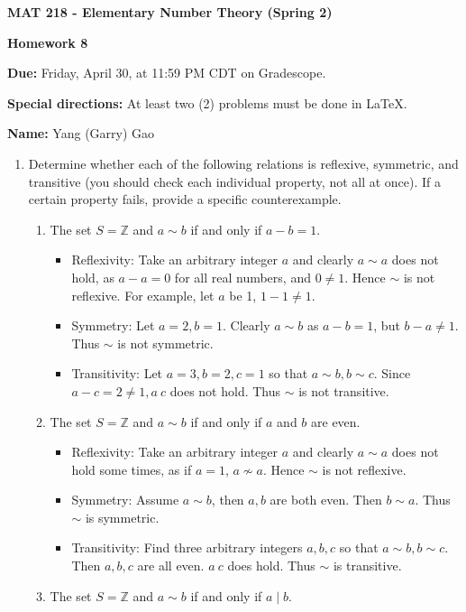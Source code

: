 \documentclass[11pt,a4paper]{article}
\newcommand{\Z}{\mathbb{Z}}
\begin{document}
\begin{Large}
\centerline{\bf MAT 218 - Elementary Number Theory (Spring 2)}\medskip
\centerline{\bf Homework 8}\medskip
\end{Large}
{\bf Due:} Friday, April 30, at 11:59 PM CDT on Gradescope.

{\bf Special directions:} At least two (2) problems must be done in \LaTeX.

{\bf Name:} Yang (Garry) Gao

\hrulefill

\begin{enumerate}

	\item Determine whether each of the following relations is reflexive, symmetric, and transitive (you should check each individual property, not all at once). If a certain property fails, provide a specific counterexample.
	\begin{enumerate}
		\item The set \(S = \Z\) and \(a \sim b\) if and only if \(a-b=1\).
			\begin{itemize}
				\item Reflexivity: Take an arbitrary integer $a$ and clearly $a\sim a$ does not hold, as $a-a=0$ for all real numbers, and $0 \ne 1$. Hence $\sim$ is not reflexive. For example, let $a$ be 1, $1-1 \ne 1.$
				\item Symmetry: Let $a = 2, b=1$. Clearly $a \sim b$ as $a-b=1$, but $b-a \ne 1$. Thus $\sim$ is not symmetric.
				\item Transitivity: Let $a=3, b=2, c=1$ so that $a\sim b, b\sim c.$ Since $a-c = 2 \ne 1, a~c$ does not hold. Thus $\sim$ is not transitive.
			\end{itemize}
		\item The set \(S = \Z\) and \(a \sim b\) if and only if \(a\) and \(b\) are even.
			\begin{itemize}
				\item Reflexivity: Take an arbitrary integer $a$ and clearly $a\sim a$ does not hold some times, as if $a=1$, $a \nsim a$. Hence $\sim$ is not reflexive.
				\item Symmetry: Assume $a \sim b$, then $a,b$ are both even. Then $b \sim a$. Thus $\sim$ is symmetric.
				\item Transitivity: Find three arbitrary integers $a,b,c$ so that $a\sim b, b\sim c.$ Then $a, b, c$ are all even. $a~c$ does hold. Thus $\sim$ is transitive.
			\end{itemize}
		\item The set \(S = \Z\) and \(a \sim b\) if and only if \(a \mid b\).

\end{enumerate}
\end{enumerate}
\end{document}
